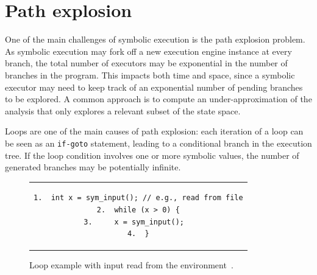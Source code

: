 
\section{Path explosion}
\label{se:path-explosion}

One of the main challenges of symbolic execution is the path explosion problem. As symbolic execution may fork off a new execution engine instance at every branch, the total number of executors may be exponential in the number of branches in the program. This impacts both time and space, since a symbolic executor may need to keep track of an exponential number of pending branches to be explored. A common approach is to compute an under-approximation of the analysis that only explores a relevant subset of the state space.

Loops are one of the main causes of path explosion: each iteration of a loop can be seen as an {\tt if-goto} statement, leading to a conditional branch in the execution tree. If the loop condition involves one or more symbolic values, the number of generated branches may be potentially infinite. 

\begin{figure}[t]
\begin{center}
\begin{tabular}{c}
\begin{lstlisting}[basicstyle=\ttfamily\scriptsize]
1.  int x = sym_input(); // e.g., read from file
2.  while (x > 0) {
3.     x = sym_input();  
4.  }
\end{lstlisting}
\end{tabular}
\end{center}
\vspace{-2mm}
\caption{Loop example with input read from the environment~\protect\cite{CS-CACM13}.}
\label{fi:example-loop}
\end{figure}

\vspace{-2pt} %

